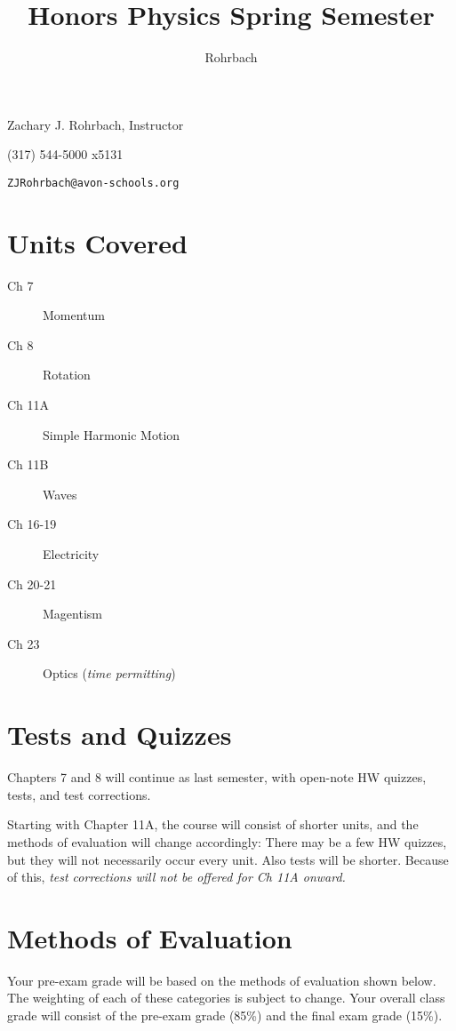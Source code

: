 \documentclass[10pt]{exam}
\title{Honors Physics Spring Semester}
\author{Rohrbach}
\begin{document}
\maketitle

\noindent Zachary J. Rohrbach, Instructor

\noindent (317) 544-5000 x5131

\noindent \texttt{ZJRohrbach@avon-schools.org}

\section*{Units Covered}

\begin{multicols}{2}
  \begin{description}
    \item [Ch 7] Momentum
    \item [Ch 8] Rotation
    \item [Ch 11A] Simple Harmonic Motion 
    \item [Ch 11B] Waves
    \item [Ch 16-19] Electricity
    \item [Ch 20-21] Magentism
    \item [Ch 23] Optics (\emph{time permitting})
    \item [] \hfill
  \end{description}
\end{multicols}

\section*{Tests and Quizzes}

Chapters 7 and 8 will continue as last semester, with open-note HW quizzes, tests, and test corrections.  

Starting with Chapter 11A, the course will consist of shorter units, and the methods of evaluation will change accordingly: There may be a few HW quizzes, but they will not necessarily occur every unit.  Also tests will be shorter.  Because of this, \emph{test corrections will not be offered for Ch 11A onward.}



\section*{Methods of Evaluation}

Your pre-exam grade will be based on the methods of 
evaluation shown below. The weighting of each of these 
categories is subject to change. Your overall class 
grade will consist of the pre-exam grade (85\%) and the
final exam grade (15\%).
\end{document}
